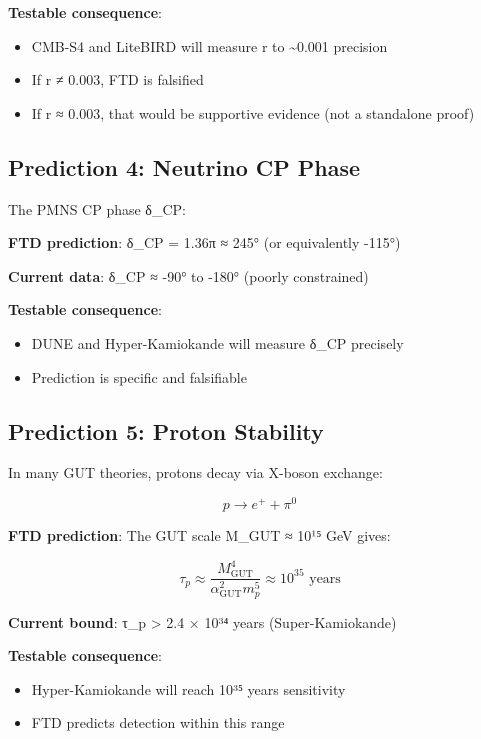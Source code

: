 \documentclass[
  11pt,
  letterpaper,
  twoside,
  openright]{book}
\providecommand{\tightlist}{%
  \setlength{\itemsep}{0pt}\setlength{\parskip}{0pt}}
\begin{document}
\textbf{Testable consequence}:

\begin{itemize}
\tightlist
\item
  CMB-S4 and LiteBIRD will measure r to \textasciitilde0.001 precision
\item
  If r ≠ 0.003, FTD is falsified
\item
  If r ≈ 0.003, that would be supportive evidence (not a standalone
  proof)
\end{itemize}

\subsection{Prediction 4: Neutrino CP
Phase}\label{prediction-4-neutrino-cp-phase}

The PMNS CP phase δ\_CP:

\textbf{FTD prediction}: δ\_CP = 1.36π ≈ 245° (or equivalently -115°)

\textbf{Current data}: δ\_CP ≈ -90° to -180° (poorly constrained)

\textbf{Testable consequence}:

\begin{itemize}
\tightlist
\item
  DUNE and Hyper-Kamiokande will measure δ\_CP precisely
\item
  Prediction is specific and falsifiable
\end{itemize}

\subsection{Prediction 5: Proton
Stability}\label{prediction-5-proton-stability}

In many GUT theories, protons decay via X-boson exchange:

\[p \to e^+ + \pi^0\]

\textbf{FTD prediction}: The GUT scale M\_GUT ≈ 10¹⁵ GeV gives:

\[\tau_p \approx \frac{M_{\text{GUT}}^4}{\alpha_{\text{GUT}}^2 m_p^5} \approx 10^{35} \text{ years}\]

\textbf{Current bound}: τ\_p \textgreater{} 2.4 × 10³⁴ years
(Super-Kamiokande)

\textbf{Testable consequence}:

\begin{itemize}
\tightlist
\item
  Hyper-Kamiokande will reach 10³⁵ years sensitivity
\item
  FTD predicts detection within this range
\end{itemize}
\end{document}

